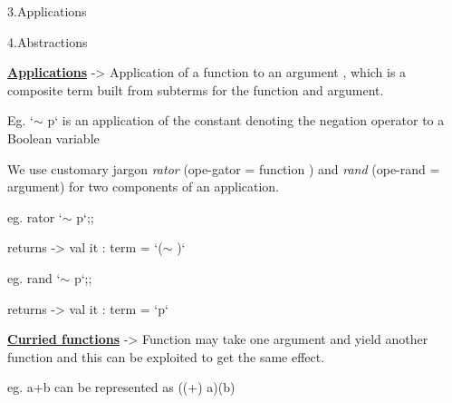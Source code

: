 \documentclass[12pt]{article}
\renewcommand{\_}{\kern-1.5pt\textunderscore\kern-1.5pt}
\begin{document}
{\fontsize{13pt}{15.6pt}\selectfont 3.Applications\par}\par

{\fontsize{13pt}{15.6pt}\selectfont 4.Abstractions\par}\par


\vspace{\baselineskip}
{\fontsize{13pt}{15.6pt}\selectfont \textbf{\uline{Applications}} -> Application of a function to an argument , which is a composite term built from subterms for the function and argument.\par}\par

{\fontsize{13pt}{15.6pt}\selectfont Eg. `$ \sim $ p` is an application of the constant denoting the negation operator to a Boolean variable\par}\par

{\fontsize{13pt}{15.6pt}\selectfont We use customary jargon \textit{rator} (ope-gator = function ) and \textit{rand }(ope-rand = argument) for two components of an application.\par}\par

{\fontsize{13pt}{15.6pt}\selectfont eg. rator `$ \sim $ p`;;\par}\par

{\fontsize{13pt}{15.6pt}\selectfont returns -> val it : term = `($ \sim $ )`\par}\par

{\fontsize{13pt}{15.6pt}\selectfont eg. rand `$ \sim $ p`;;\par}\par

{\fontsize{13pt}{15.6pt}\selectfont returns -> val it : term = `p`\par}\par


\vspace{\baselineskip}
{\fontsize{13pt}{15.6pt}\selectfont \textbf{\uline{Curried functions}} -> Function may take one argument and yield another function and this can be exploited to get the same effect.\par}\par

{\fontsize{13pt}{15.6pt}\selectfont eg. a+b can be represented as ((+) a)(b)\par}\par
\end{document}
